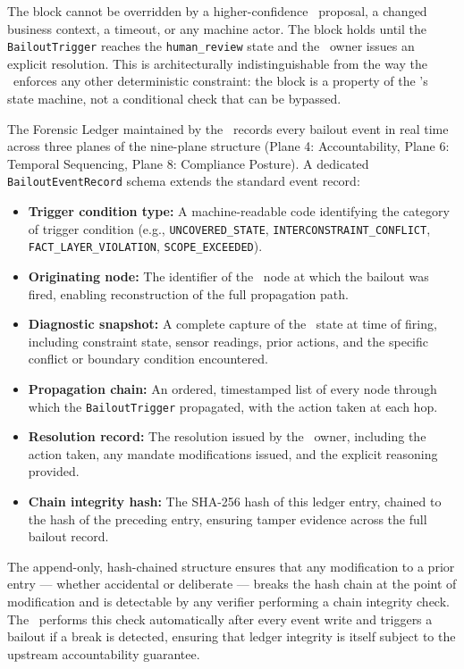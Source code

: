 The block cannot be overridden by a higher-confidence \bounds\ proposal, a changed business context, a timeout, or any machine actor. The block holds until the \texttt{BailoutTrigger} reaches the \texttt{human\_review} state and the \purpose\ owner issues an explicit resolution. This is architecturally indistinguishable from the way the \fact\ enforces any other deterministic constraint: the block is a property of the \fact's state machine, not a conditional check that can be bypassed.

The Forensic Ledger maintained by the \fact\ records every bailout event in real time across three planes of the nine-plane structure (Plane 4: Accountability, Plane 6: Temporal Sequencing, Plane 8: Compliance Posture). A dedicated \texttt{BailoutEventRecord} schema extends the standard event record:

\begin{itemize}
\item \textbf{Trigger condition type:} A machine-readable code identifying the category of trigger condition (e.g., \texttt{UNCOVERED\_STATE}, \texttt{INTERCONSTRAINT\_CONFLICT}, \texttt{FACT\_LAYER\_VIOLATION}, \texttt{SCOPE\_EXCEEDED}).
\item \textbf{Originating node:} The identifier of the \bounds\ node at which the bailout was fired, enabling reconstruction of the full propagation path.
\item \textbf{Diagnostic snapshot:} A complete capture of the \bounds\ state at time of firing, including constraint state, sensor readings, prior actions, and the specific conflict or boundary condition encountered.
\item \textbf{Propagation chain:} An ordered, timestamped list of every node through which the \texttt{BailoutTrigger} propagated, with the action taken at each hop.
\item \textbf{Resolution record:} The resolution issued by the \purpose\ owner, including the action taken, any mandate modifications issued, and the explicit reasoning provided.
\item \textbf{Chain integrity hash:} The SHA-256 hash of this ledger entry, chained to the hash of the preceding entry, ensuring tamper evidence across the full bailout record.
\end{itemize}

The append-only, hash-chained structure ensures that any modification to a prior entry --- whether accidental or deliberate --- breaks the hash chain at the point of modification and is detectable by any verifier performing a chain integrity check. The \fact\ performs this check automatically after every event write and triggers a bailout if a break is detected, ensuring that ledger integrity is itself subject to the upstream accountability guarantee.


